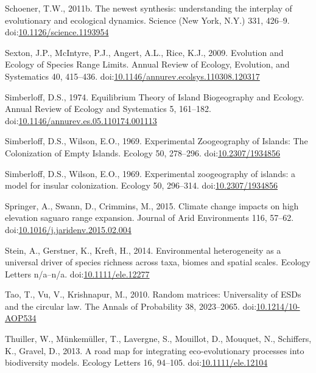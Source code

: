\hypertarget{ref-Schoener2011}{}
Schoener, T.W., 2011b. The newest synthesis: understanding the interplay
of evolutionary and ecological dynamics. Science (New York, N.Y.) 331,
426--9.
doi:\href{https://doi.org/10.1126/science.1193954}{10.1126/science.1193954}

\hypertarget{ref-Sexton2009}{}
Sexton, J.P., McIntyre, P.J., Angert, A.L., Rice, K.J., 2009. Evolution
and Ecology of Species Range Limits. Annual Review of Ecology,
Evolution, and Systematics 40, 415--436.
doi:\href{https://doi.org/10.1146/annurev.ecolsys.110308.120317}{10.1146/annurev.ecolsys.110308.120317}

\hypertarget{ref-Simberloff1974a}{}
Simberloff, D.S., 1974. Equilibrium Theory of Island Biogeography and
Ecology. Annual Review of Ecology and Systematics 5, 161--182.
doi:\href{https://doi.org/10.1146/annurev.es.05.110174.001113}{10.1146/annurev.es.05.110174.001113}

\hypertarget{ref-Simberloff1969}{}
Simberloff, D.S., Wilson, E.O., 1969. Experimental Zoogeography of
Islands: The Colonization of Empty Islands. Ecology 50, 278--296.
doi:\href{https://doi.org/10.2307/1934856}{10.2307/1934856}

\hypertarget{ref-Simberloff1969a}{}
Simberloff, D.S., Wilson, E.O., 1969. Experimental zoogeography of
islands: a model for insular colonization. Ecology 50, 296--314.
doi:\href{https://doi.org/10.2307/1934856}{10.2307/1934856}

\hypertarget{ref-Springer2015}{}
Springer, A., Swann, D., Crimmins, M., 2015. Climate change impacts on
high elevation saguaro range expansion. Journal of Arid Environments
116, 57--62.
doi:\href{https://doi.org/10.1016/j.jaridenv.2015.02.004}{10.1016/j.jaridenv.2015.02.004}

\hypertarget{ref-Stein2014}{}
Stein, A., Gerstner, K., Kreft, H., 2014. Environmental heterogeneity as
a universal driver of species richness across taxa, biomes and spatial
scales. Ecology Letters n/a--n/a.
doi:\href{https://doi.org/10.1111/ele.12277}{10.1111/ele.12277}

\hypertarget{ref-Tao2010}{}
Tao, T., Vu, V., Krishnapur, M., 2010. Random matrices: Universality of
ESDs and the circular law. The Annals of Probability 38, 2023--2065.
doi:\href{https://doi.org/10.1214/10-AOP534}{10.1214/10-AOP534}

\hypertarget{ref-Thuiller2013}{}
Thuiller, W., Münkemüller, T., Lavergne, S., Mouillot, D., Mouquet, N.,
Schiffers, K., Gravel, D., 2013. A road map for integrating
eco-evolutionary processes into biodiversity models. Ecology Letters 16,
94--105. doi:\href{https://doi.org/10.1111/ele.12104}{10.1111/ele.12104}

